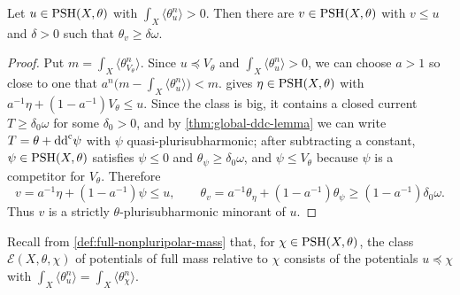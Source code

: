 \begin{lemma}\label{lem:positive-mass-strict-minorant}
Let $u\in\mathrm{PSH}(X,\theta)$ with $\int_X\langle\theta_u^n\rangle>0$. Then there are $v\in\mathrm{PSH}(X,\theta)$ with $v\leq u$ and $\delta>0$ such that $\theta_v\geq\delta\omega$.
\end{lemma}
\begin{proof}
Put $m=\int_X\langle\theta_{V_\theta}^n\rangle$. Since $u\preceq V_\theta$ and $\int_X\langle\theta_u^n\rangle>0$, we can choose $a>1$ so close to one that $a^n\bigl(m-\int_X\langle\theta_u^n\rangle\bigr)<m$.  gives $\eta\in\mathrm{PSH}(X,\theta)$ with $a^{-1}\eta+(1-a^{-1})V_\theta\leq u$. Since the class is big, it contains a closed current $T\geq\delta_0\omega$ for some $\delta_0>0$, and by \cref{thm:global-ddc-lemma} we can write $T=\theta+\mathrm{dd}^{\mathrm{c}}\psi$ with $\psi$ quasi-plurisubharmonic; after subtracting a constant, $\psi\in\mathrm{PSH}(X,\theta)$ satisfies $\psi\leq0$ and $\theta_\psi\geq\delta_0\omega$, and $\psi\leq V_\theta$ because $\psi$ is a competitor for $V_\theta$. Therefore
\[
 v=a^{-1}\eta+(1-a^{-1})\psi\leq u,\qquad
 \theta_v=a^{-1}\theta_\eta+(1-a^{-1})\theta_\psi\geq(1-a^{-1})\delta_0\omega.
\]
Thus $v$ is a strictly $\theta$-plurisubharmonic minorant of $u$.
\end{proof}

Recall from \cref{def:full-nonpluripolar-mass} that, for $\chi\in\mathrm{PSH}(X,\theta)$, the class $\mathcal E(X,\theta,\chi)$ of potentials of full mass relative to $\chi$ consists of the potentials $u\preceq\chi$ with $\int_X\langle\theta_u^n\rangle=\int_X\langle\theta_\chi^n\rangle$.

